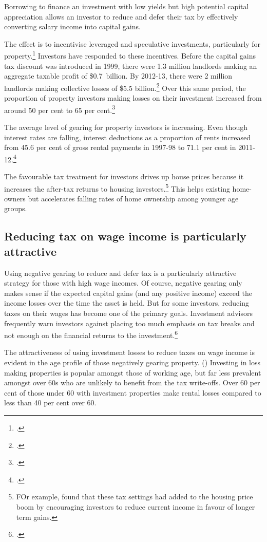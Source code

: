 \documentclass{grattan}\usepackage[]{graphicx}\usepackage[]{color}
\begin{document}
Borrowing to finance an investment with low yields but high potential capital appreciation allows an investor to reduce and defer their tax by effectively converting salary income into capital gains. 

The effect is to incentivise leveraged and speculative investments, particularly for property.\footcite[p.~17]{Inquiry2014} Investors have responded to these incentives. Before the capital gains tax discount was introduced in 1999, there were 1.3 million landlords making an aggregate taxable profit of \$0.7~billion. By 2012-13, there were 2 million landlords making collective losses of \$5.5 billion.\footcites{Eslake2013}{ATO2015} Over this same period, the proportion of property investors making losses on their investment increased from around 50 per cent to 65 per cent.\footcite{ATO2014e} 

The average level of gearing for property investors is increasing. Even though interest rates are falling, interest deductions as a proportion of rents increased from 45.6 per cent of gross rental payments in 1997-98 to 71.1 per cent in 2011-12.\footcite[p.~65]{Treasury2015}

The favourable tax treatment for investors drives up house prices because it increases the after-tax returns to housing investors.\footnote{FOr example, \textcite{Commission2004} found that these tax settings had added to the housing price boom by encouraging investors to reduce current income in favour of longer term gains.} This helps existing home-owners but accelerates falling rates of home ownership among younger age groups.

\subsection{Reducing tax on wage income is particularly attractive}
Using negative gearing to reduce and defer tax is a particularly attractive strategy for those with high wage incomes. Of course, negative gearing only makes sense if the expected capital gains (and any positive income) exceed the income losses over the time the asset is held. But for some investors, reducing taxes on their wages has become one of the primary goals. Investment advisors frequently warn investors against placing too much emphasis on tax breaks and not enough on the financial returns to the investment.\footcite[See for example:]{Brown2012}

The attractiveness of using investment losses to reduce taxes on wage income is evident in the age profile of those negatively gearing property. () Investing in loss making properties is popular amongst those of working age, but far less prevalent amongst over 60s who are unlikely to benefit from the tax write-offs. Over 60 per cent of those under 60 with investment properties make rental losses compared to less than 40 per cent over 60. 
\end{document}
